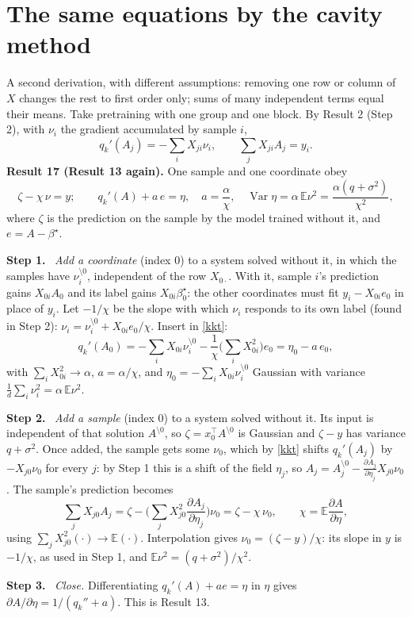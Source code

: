 \documentclass[10pt]{article}
\newcommand{\bs}{\beta^\star}\newcommand{\E}{\mathbb E}\newcommand{\asinh}{\operatorname{arcsinh}}\newcommand{\sk}{\sqrt k}
\newcommand{\step}[1]{\par\smallskip\textbf{Step #1.}\ }
\begin{document}
\section{The same equations by the cavity method}
A second derivation, with different assumptions: removing one row or column of $X$ changes the rest to first order only; sums of many independent terms equal their means. Take pretraining with one group and one block. By Result 2 (Step 2), with $\nu_i$ the gradient accumulated by sample $i$,
\begin{equation}\label{kkt}
q_k'(A_j)=-\sum_iX_{ji}\nu_i,\qquad\sum_jX_{ji}A_j=y_i .
\end{equation}
\textbf{Result 17 (Result 13 again).} One sample and one coordinate obey
\[
\zeta-\chi\,\nu=y;\qquad q_k'(A)+a\,e=\eta,\quad a=\frac\alpha\chi,\quad\operatorname{Var}\eta=\alpha\,\E\nu^2=\frac{\alpha(q+\sigma^2)}{\chi^2},
\]
where $\zeta$ is the prediction on the sample by the model trained without it, and $e=A-\bs$.
\step1 \emph{Add a coordinate} (index $0$) to a system solved without it, in which the samples have $\nu_i^{\setminus0}$, independent of the row $X_{0\cdot}$. With it, sample $i$'s prediction gains $X_{0i}A_0$ and its label gains $X_{0i}\bs_0$: the other coordinates must fit $y_i-X_{0i}e_0$ in place of $y_i$. Let $-1/\chi$ be the slope with which $\nu_i$ responds to its own label (found in Step 2): $\nu_i=\nu_i^{\setminus0}+X_{0i}e_0/\chi$. Insert in \eqref{kkt}:
\[
q_k'(A_0)=-\sum_iX_{0i}\nu_i^{\setminus0}-\frac1\chi\Big(\sum_iX_{0i}^2\Big)e_0=\eta_0-a\,e_0,
\]
with $\sum_iX_{0i}^2\to\alpha$, $a=\alpha/\chi$, and $\eta_0=-\sum_iX_{0i}\nu_i^{\setminus0}$ Gaussian with variance $\frac1d\sum_i\nu_i^2=\alpha\,\E\nu^2$.
\step2 \emph{Add a sample} (index $0$) to a system solved without it. Its input is independent of that solution $A^{\setminus0}$, so $\zeta=x_0^\top A^{\setminus0}$ is Gaussian and $\zeta-y$ has variance $q+\sigma^2$. Once added, the sample gets some $\nu_0$, which by \eqref{kkt} shifts $q_k'(A_j)$ by $-X_{j0}\nu_0$ for every $j$: by Step 1 this is a shift of the field $\eta_j$, so $A_j=A_j^{\setminus0}-\frac{\partial A_j}{\partial\eta_j}X_{j0}\nu_0$. The sample's prediction becomes
\[
\sum_jX_{j0}A_j=\zeta-\Big(\sum_jX_{j0}^2\frac{\partial A_j}{\partial\eta_j}\Big)\nu_0=\zeta-\chi\,\nu_0,\qquad\chi=\E\frac{\partial A}{\partial\eta},
\]
using $\sum_jX_{j0}^2(\cdot)\to\E(\cdot)$. Interpolation gives $\nu_0=(\zeta-y)/\chi$: its slope in $y$ is $-1/\chi$, as used in Step 1, and $\E\nu^2=(q+\sigma^2)/\chi^2$.
\step3 \emph{Close.} Differentiating $q_k'(A)+ae=\eta$ in $\eta$ gives $\partial A/\partial\eta=1/(q_k''+a)$. This is Result 13.
\end{document}
